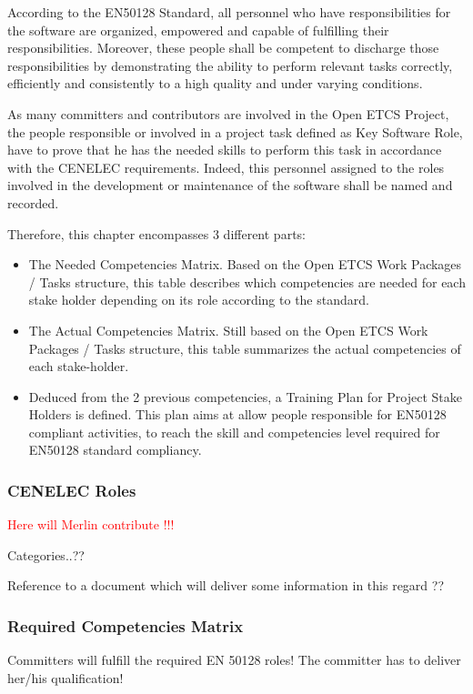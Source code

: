 \documentclass{template/openetcs_article}
\begin{document}
According to the EN50128 Standard, all personnel who have responsibilities for the software are organized, empowered and capable of fulfilling their responsibilities. Moreover, these people shall be competent to discharge those responsibilities by demonstrating the ability to perform relevant tasks correctly, efficiently and consistently to a high quality and under varying conditions.

As many committers and contributors are involved in the Open ETCS Project, the people responsible or involved in a project task defined as Key Software Role, have to prove that he has the needed skills to perform this task in accordance with the CENELEC requirements. Indeed, this personnel assigned to the roles involved in the development or maintenance of the software shall be named and recorded.

Therefore, this chapter encompasses 3 different parts:
\begin{itemize}
\item The Needed Competencies Matrix. Based on the Open ETCS Work Packages / Tasks structure, this table describes which competencies are needed for each stake holder depending on its role according to the standard.
\item The Actual Competencies Matrix. Still based on the Open ETCS Work Packages / Tasks structure, this table summarizes the actual competencies of each stake-holder.
\item Deduced from the 2 previous competencies, a Training Plan for Project Stake Holders is defined. This plan aims at allow people responsible for EN50128 compliant activities, to reach the skill and competencies level required for EN50128 standard compliancy.
\end{itemize}


\subsubsection{CENELEC Roles}
\textcolor{red}{Here will Merlin contribute !!!}

Categories..??

Reference to a document which will deliver some information in this regard ??


\subsubsection{Required Competencies Matrix}
Committers will fulfill the required EN 50128 roles! The committer has to deliver her/his qualification!
\end{document}
